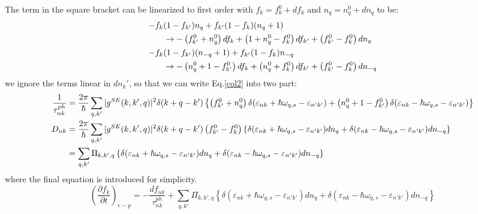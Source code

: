 \documentclass{article}
\newcommand{\pfrac}[2]{\frac{\partial #1}{\partial #2}}
\begin{document}
The term in the square bracket can be linearized to first order with 
$f_k = f_k^0 + df_k$ and $n_q = n_q^0 + dn_q$ to be:
\begin{align}
    -f_{k} & (1-f_{k'}) n_{q} + f_{k'} (1-f_{k}) (n_{q}+1) \notag \\
          &\to -\left(f_{k'}^0 + n_{q}^0\right) df_k + \left( 1 + n_q^0 - f_k^0 \right) df_{k'} + \left( f_{k'}^0 - f_k^0 \right) dn_q \\
    -f_{k} & (1-f_{k'}) (n_{-q}+1) + f_{k'} (1-f_{k}) n_{-q} \notag \\
                &\to -\left(n_{q}^0 + 1 - f_{k'}^0 \right) df_k + \left( n_q^0 + f_k^0 \right) df_{k'} + \left( f_{k'}^0 - f_k^0 \right) dn_{-q} \\
\end{align}
we ignore the terms linear in $dn_k'$, so that we can write Eq.\ref{col2} into two part:
\begin{align}
    \frac{1}{\tau_{nk}^{ph}} &= \frac{2\pi}{\hbar} \sum_{q,k'} |g^{SE}(k,k',q)|^2  \delta(k+q-k')
      \left\{ \left(f_{k'}^0 + n_{q}^0\right)\delta(\varepsilon_{nk} + \hbar\omega_{q,s} - \varepsilon_{n'k'}) + \left(n_{q}^0 + 1 - f_{k'}^0 \right) \delta(\varepsilon_{nk} - \hbar\omega_{q,s} - \varepsilon_{n'k'})\right\} \label{taunk} \\
    D_{nk} &= \frac{2\pi}{\hbar} \sum_{q,k'} |g^{SE}(k,k',q)|^2  \delta(k+q-k') \left( f_{k'}^0 - f_k^0 \right)
      \left\{  \delta(\varepsilon_{nk} + \hbar\omega_{q,s} - \varepsilon_{n'k'}) dn_q + \delta(\varepsilon_{nk} - \hbar\omega_{q,s} - \varepsilon_{n'k'})dn_{-q} \right\} \notag \\
            & = \sum_{q,k'} \Pi_{k,k',q} \left\{  \delta(\varepsilon_{nk} + \hbar\omega_{q,s} - \varepsilon_{n'k'}) dn_q + \delta(\varepsilon_{nk} - \hbar\omega_{q,s} - \varepsilon_{n'k'})dn_{-q} \right\} \label{Dnk}
\end{align}
where the final equation is introduced for simplicity.
\begin{equation}
    \left(\pfrac{f_{k}}{t}\right)_{e-p} = -\frac{df_{nk}}{\tau_{nk}^{ph}} + 
      \sum_{q,k'} \Pi_{k,k',q} \left\{  \delta(\varepsilon_{nk} + \hbar\omega_{q,s} - \varepsilon_{n'k'}) dn_q + \delta(\varepsilon_{nk} - \hbar\omega_{q,s} - \varepsilon_{n'k'})dn_{-q} \right\} 
\end{equation}
\end{document}
